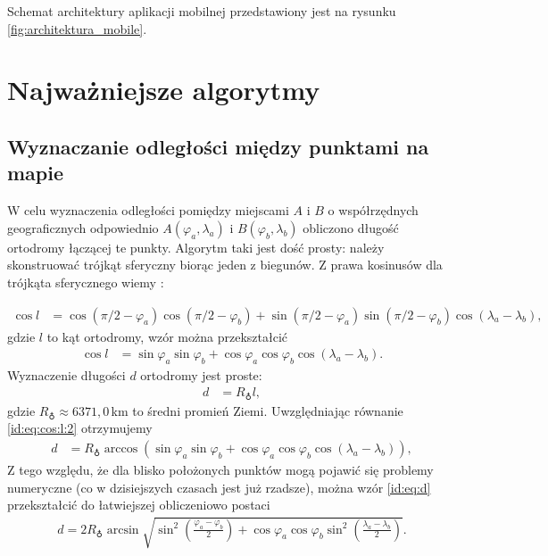\documentclass[a4paper]{book}
\begin{document}
			Schemat architektury aplikacji mobilnej przedstawiony jest na rysunku \ref{fig:architektura_mobile}. 
			
		\section{Najważniejsze algorytmy}
		\label{id:sec:algorytmy}
			\subsection{Wyznaczanie odległości między punktami na mapie}
				
			W celu wyznaczenia odległości pomiędzy miejscami $A$ i $B$ o współrzędnych geograficznych odpowiednio $A(\varphi_a, \lambda_a)$ i $B(\varphi_b, \lambda_b)$ obliczono długość ortodromy łączącej te punkty. Algorytm taki jest dość prosty: należy skonstruować 
			trójkąt sferyczny biorąc jeden z biegunów. Z prawa kosinusów dla trójkąta sferycznego wiemy \cite{id:Mietelski1989Atronomia}:		
		
			\begin{align}
			\cos l & = \cos (\pi/2 - \varphi_a) \cos (\pi/2 - \varphi_b) + \sin (\pi/2 - \varphi_a) \sin (\pi/2 - \varphi_b) \cos (\lambda_a - \lambda_b),
			\end{align}
			gdzie $l$ to kąt ortodromy, wzór można przekształcić
			\begin{align}
			\cos l & = \sin\varphi_a \sin \varphi_b + \cos\varphi_a \cos\varphi_b \cos (\lambda_a - \lambda_b).\label{id:eq:cos:l:2}						
			\end{align}
			Wyznaczenie długości $d$ ortodromy jest proste:
			\begin{align}
			d & =   R_{\earth} l,
			\end{align}
			gdzie $R_{\earth} \approx 6371{,}0\,$km to średni promień Ziemi.
			Uwzględniając równanie \eqref{id:eq:cos:l:2} otrzymujemy
			\begin{align}
		    d & =   R_{\earth} \arccos \left( \sin\varphi_a \sin \varphi_b + \cos\varphi_a \cos\varphi_b \cos (\lambda_a - \lambda_b) \right),\label{id:eq:d}
			\end{align}
			Z tego względu, że dla blisko położonych punktów mogą pojawić się problemy numeryczne (co w dzisiejszych czasach jest już rzadsze), można wzór \eqref{id:eq:d} przekształcić do łatwiejszej obliczeniowo postaci
			\begin{align}
            d = 2R_{\earth} \arcsin\sqrt{\sin^{2}\left(\frac{\varphi_a - \varphi_b}{2}\right) + \cos\varphi_a\cos\varphi_b\sin^{2}\left(\frac{\lambda_a - \lambda_b}{2}\right) }.
			\end{align}
						
\end{document}
